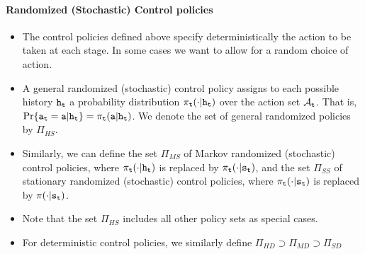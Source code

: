 \paragraph{Randomized (Stochastic) Control policies}
\begin{itemize}
  \item The control policies defined above specify deterministically the action to be taken at each stage. In some cases we want to allow for a random choice of action.
  \item
A general randomized (stochastic) control policy assigns to each
possible history ${{\tt h}_{\tt t}}$ a probability distribution
${\pi _{\tt t}}( \cdot |{{\tt h}_{\tt t}})$ over the action set
${\mathcal{A}_{\tt t}}$. That is,  $\Pr\{ {{\tt a}_{\tt t}} =
{\tt a}|{{\tt h}_{\tt t}}\}  = {\pi
_{\tt t}}({\tt a}|{{\tt h}_{\tt t}})$. We denote the set of general
randomized policies by ${\Pi _{HS}}$.
  \item Similarly, we can define the set ${\Pi _{MS}}$ of Markov randomized (stochastic) control policies, where ${\pi _{\tt t}}( \cdot |{{\tt h}_{\tt t}})$ is replaced by ${\pi _{\tt t}}( \cdot |{{\tt s}_{\tt t}})$, and the set ${\Pi _{SS}}$ of stationary randomized (stochastic) control policies, where ${\pi _{\tt t}}( \cdot |{{\tt s}_{\tt t}})$ is replaced by  $\pi ( \cdot |{{\tt s}_{\tt t}})$.
  \item Note that the set ${\Pi _{HS}}$ includes all other policy sets as special cases.
  \item For deterministic control policies, we similarly define ${\Pi _{HD}} \supset {\Pi _{MD}} \supset {\Pi _{SD}}$
\end{itemize}



